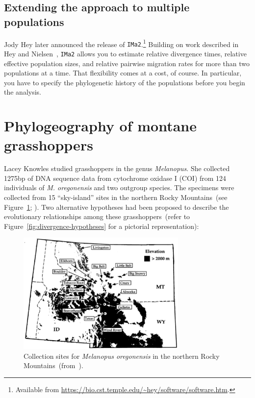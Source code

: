\documentclass[12pt]{article}
\begin{document}
\subsection*{Extending the approach to multiple populations}

Jody Hey later announced the release of {\tt IMa2}.\footnote{Available
  from \url{https://bio.cst.temple.edu/~hey/software/software.htm}.}
Building on work described in Hey and
Nielsen~\cite{Hey-Nielsen-2004,Hey-Nielsen-2007}, {\tt IMa2} allows
you to estimate relative divergence times, relative effective
population sizes, and relative pairwise migration rates for more than
two populations at a time. That flexibility comes at a cost, of
course. In particular, you have to specify the phylogenetic history of
the populations before you begin the analysis.

\section*{Phylogeography of montane grasshoppers}

Lacey Knowles studied grasshoppers in the genus {\it Melanopus}. She
collected 1275bp of DNA sequence data from cytochrome oxidase I (COI)
from 124 individuals of {\it M. oregonensis\/} and two outgroup
species. The specimens were collected from 15 ``sky-island'' sites in
the northern Rocky Mountains~(see Figure~\ref{fig:sky-islands};
\cite{Knowles-2001}). Two alternative hypotheses had been proposed to
describe the evolutionary relationships among these
grasshoppers~(refer to Figure~\ref{fig:divergence-hypotheses} for a
pictorial representation):

\begin{figure}
\begin{center}
\includegraphics[height=6cm]{sky-islands.eps}
\end{center}
\caption{Collection sites for {\it Melanopus oregonensis\/} in the
  northern Rocky Mountains~(from~\cite{Knowles-2001}).}\label{fig:sky-islands}
\end{figure}
\end{document}
